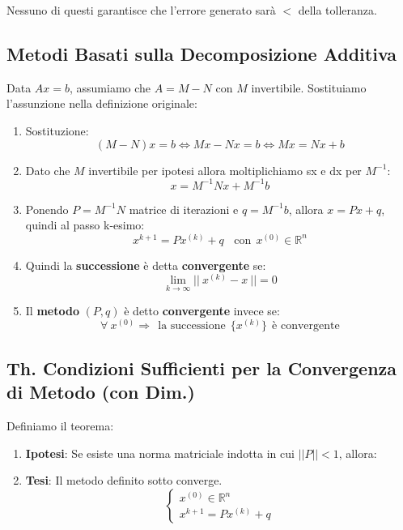 \documentclass{article}
\begin{document}
Nessuno di questi garantisce che l'errore generato sarà $<$ della tolleranza.

\subsection{Metodi Basati sulla Decomposizione Additiva}

Data $Ax = b$, assumiamo che $A = M - N$ con $M$ invertibile. Sostituiamo l'assunzione nella definizione originale:

\vspace*{8px}

\begin{enumerate}
    \item Sostituzione:
    \[ (M - N)x = b \Leftrightarrow Mx - Nx = b \Leftrightarrow Mx = Nx + b  \]
    \vspace*{15px}
    \item Dato che $M$ invertibile per ipotesi allora moltiplichiamo sx e dx per $M^{-1}$:
    \[ x = M^{-1}Nx + M^{-1}b \]
    \item Ponendo $P=M^{-1}N$ matrice di iterazioni e $q = M^{-1}b$, allora $x = Px + q$, quindi al passo k-esimo:
    \vspace*{8px}
    \[ x^{k+1} = Px^{(k)} + q \:\:\:\: \text{con} \:\: x^{(0)} \in \mathbb{R}^{n} \]
    \item Quindi la \textbf{successione} è detta \textbf{convergente} se:
    \[ \lim_{k \rightarrow \infty} ||\: x^{(k)} - x \:|| = 0 \]
    \item Il \textbf{metodo} $(P,q)$ è detto \textbf{convergente} invece se: 
    \[ \forall \: x^{(0)} \Rightarrow \:\: \text{la successione} \:\: \{ x^{(k)} \} \:\: \text{è convergente}\]
\end{enumerate}

\subsection{Th. Condizioni Sufficienti per la Convergenza di Metodo (con Dim.)}

Definiamo il teorema:

\begin{enumerate}
    \item \textbf{Ipotesi}: Se esiste una norma matriciale indotta in cui $||P|| < 1$, allora:
    \item \textbf{Tesi}: Il metodo definito sotto converge.
    \vspace*{10px}
    \[ \left\{ \begin{array}{lll}
        x^{(0)} \in \mathbb{R}^{n} \\ 
        x^{k+1} = Px^{(k)} + q 
        \end{array}\right.
         \]
\end{enumerate}
\end{document}
